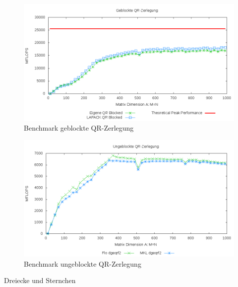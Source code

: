 \begin{figure}[H]
	\includegraphics[width=\textwidth]{images/blk.png}
	\caption{Benchmark geblockte QR-Zerlegung}
	\label{img:blk}
\end{figure}

\begin{figure}[H]
	\includegraphics[width=\textwidth]{images/unblk.png}
	\caption{Benchmark ungeblockte QR-Zerlegung}
	\label{img:unblk}
\end{figure}

Dreiecke und Sternchen









	 
